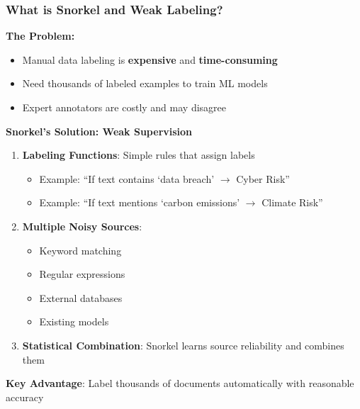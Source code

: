 \documentclass[aspectratio=169]{beamer}
\begin{document}
\begin{frame}
\frametitle{What is Snorkel and Weak Labeling?}

\textbf{The Problem:}
\begin{itemize}
\item Manual data labeling is \textbf{expensive} and \textbf{time-consuming}
\item Need thousands of labeled examples to train ML models
\item Expert annotators are costly and may disagree
\end{itemize}

\vspace{0.5cm}

\textbf{Snorkel's Solution: Weak Supervision}
\begin{enumerate}
\item \textbf{Labeling Functions}: Simple rules that assign labels
\begin{itemize}
\item Example: ``If text contains `data breach' $\rightarrow$ Cyber Risk''
\item Example: ``If text mentions `carbon emissions' $\rightarrow$ Climate Risk''
\end{itemize}

\item \textbf{Multiple Noisy Sources}:
\begin{itemize}
\item Keyword matching
\item Regular expressions
\item External databases
\item Existing models
\end{itemize}

\item \textbf{Statistical Combination}: Snorkel learns source reliability and combines them
\end{enumerate}

\textbf{Key Advantage}: Label thousands of documents automatically with reasonable accuracy

\end{frame}
%
%
\end{document}
